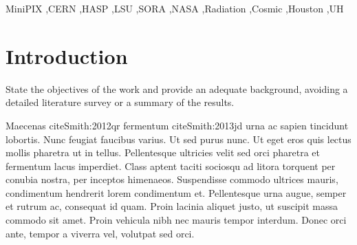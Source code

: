 \documentclass[preprint,12pt]{elsarticle}
\begin{document}
\begin{frontmatter}
\begin{keyword}
MiniPIX \sep CERN \sep HASP \sep LSU \sep SORA \sep NASA \sep Radiation \sep Cosmic \sep Houston \sep UH


\end{keyword}



\end{frontmatter}

\linenumbers

\section{Introduction}
\label{Introduction}

State the objectives of the work and provide an adequate background, avoiding a detailed literature survey or a summary of the results.


Maecenas cite{Smith:2012qr} fermentum cite{Smith:2013jd} urna ac sapien tincidunt lobortis. Nunc feugiat faucibus varius. Ut sed purus nunc. Ut eget eros quis lectus mollis pharetra ut in tellus. Pellentesque ultricies velit sed orci pharetra et fermentum lacus imperdiet. Class aptent taciti sociosqu ad litora torquent per conubia nostra, per inceptos himenaeos. Suspendisse commodo ultrices mauris, condimentum hendrerit lorem condimentum et. Pellentesque urna augue, semper et rutrum ac, consequat id quam. Proin lacinia aliquet justo, ut suscipit massa commodo sit amet. Proin vehicula nibh nec mauris tempor interdum. Donec orci ante, tempor a viverra vel, volutpat sed orci.
\end{document}
